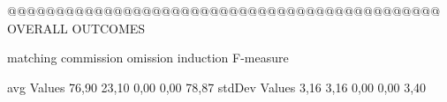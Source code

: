 @@@@@@@@@@@@@@@@@@@@@@@@@@@@@@@@@@@@@@@@@@@@@ OVERALL OUTCOMES

               matching commission   omission  induction  F-measure
               
avg Values      76,90      23,10       0,00      0,00     78,87        
stdDev Values    3,16       3,16       0,00       0,00      3,40        